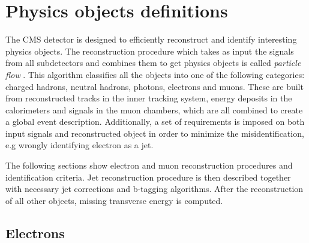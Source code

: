 \chapter{Physics objects definitions} %

\label{Chapter5} %


The CMS detector is designed to efficiently reconstruct and identify interesting physics objects. The reconstruction procedure which takes as input the signals from all subdetectors and combines them to get physics objects is called \textit{particle flow} \cite{CMS:2009nxa}. This algorithm classifies all the objects into one of the following categories: charged hadrons, neutral hadrons, photons, electrons and muons. These are built from reconstructed tracks in the inner tracking system, energy deposits in the calorimeters and signals in the muon chambers, which are all combined to create a global event description. Additionally, a set of requirements is imposed on both input signals and reconstructed object in order to minimize the misidentification, e.g wrongly identifying electron as a jet. 
\par The following sections show electron and muon reconstruction procedures and identification criteria. Jet reconstruction procedure is then described together with necessary jet corrections and b-tagging algorithms. After the reconstruction of all other objects, missing transverse energy is computed.


\section{Electrons}

